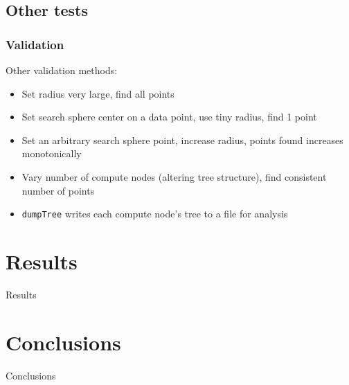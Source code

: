 \documentclass[usernames,dvipsnames]{beamer}
\begin{document}
\subsection{Other tests}

\begin{frame}	
	\frametitle{Validation}
	
	\begin{block}{Other validation methods:}
		\begin{itemize}
			\item Set radius very large, find all points
			\item Set search sphere center on a data point, use tiny radius, find 1 point
			\item Set an arbitrary search sphere point, increase radius, points found increases monotonically
			\item Vary number of compute nodes (altering tree structure), find consistent number of points
			\item \texttt{dumpTree} writes each compute node's tree to a file for analysis
		\end{itemize}
	\end{block}
	
\end{frame}




\section{Results}

\begin{frame}	
	\begin{Huge}
		\begin{center}
			Results
		\end{center}
	\end{Huge}
\end{frame}


\section{Conclusions}

\begin{frame}	
	\begin{Huge}
		\begin{center}
			Conclusions
		\end{center}
	\end{Huge}
\end{frame}
\end{document}

